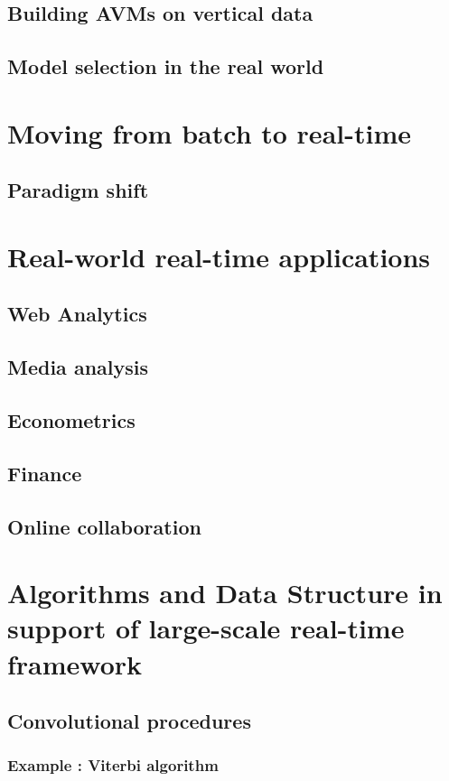 \documentclass[]{book}    %
\begin{document}
\section{Building AVMs on vertical data}
\section{Model selection in the real world}

\chapter{Moving from batch to real-time}
\section{Paradigm shift}

\chapter{Real-world real-time applications}
\section{Web Analytics}
\section{Media analysis}
\section{Econometrics}
\section{Finance}
\section{Online collaboration}

\chapter{Algorithms and Data Structure in support of large-scale real-time framework}
\section{Convolutional procedures}
\subsection{Example : Viterbi algorithm}
\end{document}
